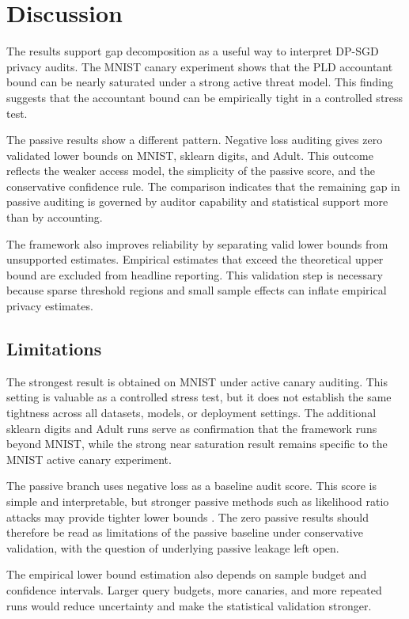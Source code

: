 \documentclass{article}
\begin{document}
\section{Discussion}
The results support gap decomposition as a useful way to interpret DP-SGD privacy audits. The MNIST canary experiment shows that the PLD accountant bound can be nearly saturated under a strong active threat model. This finding suggests that the accountant bound can be empirically tight in a controlled stress test.

The passive results show a different pattern. Negative loss auditing gives zero validated lower bounds on MNIST, sklearn digits, and Adult. This outcome reflects the weaker access model, the simplicity of the passive score, and the conservative confidence rule. The comparison indicates that the remaining gap in passive auditing is governed by auditor capability and statistical support more than by accounting.

The framework also improves reliability by separating valid lower bounds from unsupported estimates. Empirical estimates that exceed the theoretical upper bound are excluded from headline reporting. This validation step is necessary because sparse threshold regions and small sample effects can inflate empirical privacy estimates.

\subsection{Limitations}
The strongest result is obtained on MNIST under active canary auditing. This setting is valuable as a controlled stress test, but it does not establish the same tightness across all datasets, models, or deployment settings. The additional sklearn digits and Adult runs serve as confirmation that the framework runs beyond MNIST, while the strong near saturation result remains specific to the MNIST active canary experiment.

The passive branch uses negative loss as a baseline audit score. This score is simple and interpretable, but stronger passive methods such as likelihood ratio attacks may provide tighter lower bounds \citep{carlini2022membership}. The zero passive results should therefore be read as limitations of the passive baseline under conservative validation, with the question of underlying passive leakage left open.

The empirical lower bound estimation also depends on sample budget and confidence intervals. Larger query budgets, more canaries, and more repeated runs would reduce uncertainty and make the statistical validation stronger.
\end{document}
